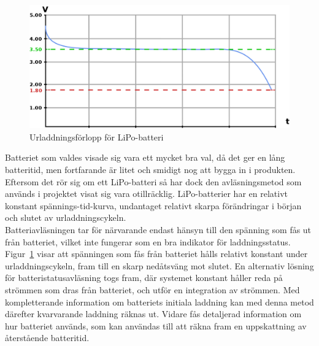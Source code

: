 \documentclass[a4paper,11pt]{article}
\begin{document}
\begin{figure}[H]
\begin{center}
\includegraphics[scale=0.35, angle=0]{battery.png}
\end{center}
\caption{Urladdningsförlopp för LiPo-batteri}
\label{fig:batterygraph}
\end{figure}

Batteriet som valdes visade sig vara ett mycket bra val, då det ger en lång batteritid, men fortfarande är litet och smidigt nog att bygga in i produkten. Eftersom det rör sig om ett LiPo-batteri så har dock den avläsningsmetod som används i projektet visat sig vara otillräcklig. LiPo-batterier har en relativt konstant spännings-tid-kurva, undantaget relativt skarpa förändringar i början och slutet av urladdningscykeln. \\

Batteriavläsningen tar för närvarande endast hänsyn till den spänning som fås ut från batteriet, vilket inte fungerar som en bra indikator för laddningsstatus. Figur~\ref{fig:batterygraph} visar att spänningen som fås från batteriet hålls relativt konstant under urladdningscykeln, fram till en skarp nedåtsväng mot slutet. En alternativ lösning för batteristatusavläsning togs fram, där systemet konstant håller reda på strömmen som dras från batteriet, och utför en integration av strömmen. Med kompletterande information om batteriets initiala laddning kan med denna metod därefter kvarvarande laddning räknas ut. Vidare fås detaljerad information om hur batteriet används, som kan användas till att räkna fram en uppskattning av återstående batteritid. \\
\end{document}
